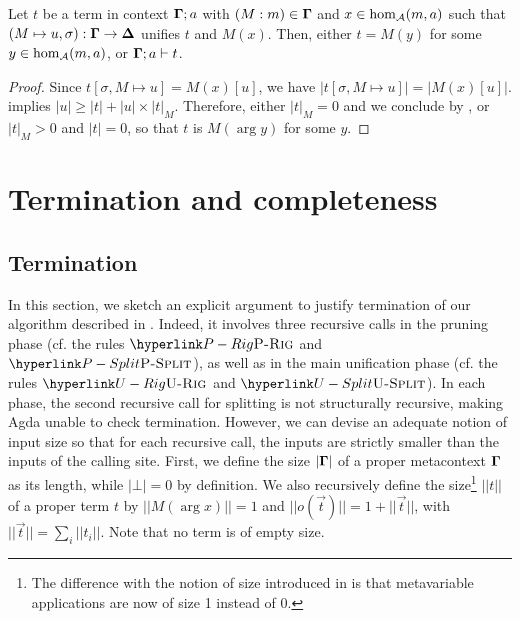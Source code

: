 %
\begin{corollary}
\label{cor:occurcheck-final}Let $t$ be a term in context $\dotmcontext{\Gamma};a$
with $(M:m)\in\dotmcontext{\Gamma}$ and $x\in\hom_{{\cal A}}(m,a)$
such that $(M\mapsto u,\sigma):\dotmcontext{\Gamma}\rightarrow\dotmcontext{\Delta}$
unifies $t$ and $M(x)$. Then, either $t=M(y)$ for some $y\in\hom_{{\cal A}}(m,a)$,
or $\dotmcontext{\Gamma};a\vdash t$. 
\end{corollary}
\begin{proof}
Since $t[\sigma,M\mapsto u]=M(x)[u]$, we have $|t[\sigma,M\mapsto u]|=|M(x)[u]|$.
 implies $|u|\geq|t|+|u|\times|t|_{M}$.
Therefore, either $|t|_{M}=0$ and we conclude by ,
or $|t|_{M}>0$ and $|t|=0$, so that $t$ is $M(\arg y)$ for some
$y$.
\end{proof}

\section{Termination and completeness}

\label{sec:termination-completeness}

\subsection{Termination}

\label{subsec:termination}

 In this section, we sketch an explicit argument to justify termination
of our algorithm described in . Indeed, it
involves three recursive calls in the pruning phase (cf. the rules
$\refrule{P-Rig}$ and $\refrule{P-Split}$), as well as in the main
unification phase (cf. the rules $\refrule{U-Rig}$ and $\refrule{U-Split}$).
In each phase, the second recursive call for splitting is not structurally
recursive, making Agda unable to check termination. However, we can
devise an adequate notion of input size so that for each recursive
call, the inputs are strictly smaller than the inputs of the calling
site. First, we define the size $|\dotmcontext{\Gamma}|$ of a proper
metacontext $\dotmcontext{\Gamma}$ as its length, while $|\bot|=0$
by definition.  We also recursively define the size\footnote{The difference with the notion of size introduced in 
is that metavariable applications are now of size 1 instead of 0. } $||t||$ of a proper term $t$ by $||M(\arg x)||=1$ and $||o(\vec{t})||=1+||\vec{t}||$,
with $||\vec{t}||=\sum_{i}||t_{i}||$. Note that no term is of empty
size. 

